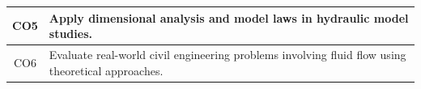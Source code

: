 \documentclass[12pt, a4paper]{article}
\begin{document}
\begin{center}
\begin{tabularx}{\textwidth}{|c|X|}
                                                                                                                                                                                                                                                                                                                                                                                CO5 & Apply dimensional analysis and model laws in hydraulic model studies. \\
                                                                                                                                                                                                                                                                                                                                                                                        \hline
                                                                                                                                                                                                                                                                                                                                                                                                CO6 & Evaluate real-world civil engineering problems involving fluid flow using theoretical approaches. \\
                                                                                                                                                                                                                                                                                                                                                                                                        \hline
                                                                                                                                                                                                                                                                                                                                                                                                            \end{tabularx}
                                                                                                                                                                                                                                                                                                                                                                                                            \end{center}
\end{document}
